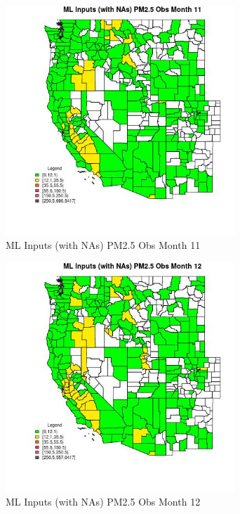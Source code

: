 \clearpage 

\begin{figure} 
\centering  
\includegraphics[width=0.77\textwidth]{Code_Outputs/Report_ML_input_PM25_Step4_part_e_de_duplicated_aves_compiled_2019-05-21wNAs_CountyPM25_ObsmedianMonth11.jpg} 
\caption{\label{fig:Report_ML_input_PM25_Step4_part_e_de_duplicated_aves_compiled_2019-05-21wNAsCountyPM25_ObsmedianMonth11}ML Inputs (with NAs) PM2.5 Obs Month 11} 
\end{figure} 
 

\begin{figure} 
\centering  
\includegraphics[width=0.77\textwidth]{Code_Outputs/Report_ML_input_PM25_Step4_part_e_de_duplicated_aves_compiled_2019-05-21wNAs_CountyPM25_ObsmedianMonth12.jpg} 
\caption{\label{fig:Report_ML_input_PM25_Step4_part_e_de_duplicated_aves_compiled_2019-05-21wNAsCountyPM25_ObsmedianMonth12}ML Inputs (with NAs) PM2.5 Obs Month 12} 
\end{figure} 
 

